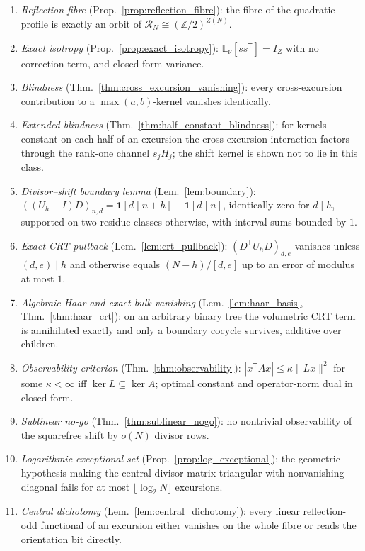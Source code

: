 \documentclass[11pt]{amsart}
\numberwithin{equation}{section}
\theoremstyle{plain}
\theoremstyle{definition}
\theoremstyle{remark}
\begin{document}
\begin{enumerate}[label=(\roman*)]
\item \emph{Reflection fibre} (Prop.~\ref{prop:reflection_fibre}): the
fibre of the quadratic profile is exactly an orbit of
$\mathcal R_N\cong(\mathbb Z/2)^{Z(N)}$.
\item \emph{Exact isotropy} (Prop.~\ref{prop:exact_isotropy}):
$\mathbb E_\nu[ss^{\mathsf T}]=I_Z$ with no correction term, and closed-form
variance.
\item \emph{Blindness} (Thm.~\ref{thm:cross_excursion_vanishing}): every
cross-excursion contribution to a $\max(a,b)$-kernel vanishes
identically.
\item \emph{Extended blindness}
(Thm.~\ref{thm:half_constant_blindness}): for kernels constant on each
half of an excursion the cross-excursion interaction factors through the
rank-one channel $s_jH_j$; the shift kernel is shown not to lie in this
class.
\item \emph{Divisor--shift boundary lemma} (Lem.~\ref{lem:boundary}):
$((U_h-I)D)_{n,d}=\mathbf 1[d\mid n+h]-\mathbf 1[d\mid n]$, identically
zero for $d\mid h$, supported on two residue classes otherwise, with
interval sums bounded by $1$.
\item \emph{Exact CRT pullback} (Lem.~\ref{lem:crt_pullback}):
$(D^{\mathsf T}U_hD)_{d,e}$ vanishes unless $(d,e)\mid h$ and otherwise
equals $(N-h)/[d,e]$ up to an error of modulus at most $1$.
\item \emph{Algebraic Haar and exact bulk vanishing}
(Lem.~\ref{lem:haar_basis}, Thm.~\ref{thm:haar_crt}): on an arbitrary
binary tree the volumetric CRT term is annihilated exactly and only a
boundary cocycle survives, additive over children.
\item \emph{Observability criterion} (Thm.~\ref{thm:observability}):
$|x^{\mathsf T}Ax|\le\kappa\|Lx\|^2$ for some $\kappa<\infty$ iff
$\ker L\subseteq\ker A$; optimal constant and operator-norm dual in
closed form.
\item \emph{Sublinear no-go} (Thm.~\ref{thm:sublinear_nogo}): no
nontrivial observability of the squarefree shift by $o(N)$ divisor rows.
\item \emph{Logarithmic exceptional set}
(Prop.~\ref{prop:log_exceptional}): the geometric hypothesis making the
central divisor matrix triangular with nonvanishing diagonal fails for at
most $\lfloor\log_2 N\rfloor$ excursions.
\item \emph{Central dichotomy} (Lem.~\ref{lem:central_dichotomy}): every
linear reflection-odd functional of an excursion either vanishes on the
whole fibre or reads the orientation bit directly.
\end{enumerate}
\end{document}

